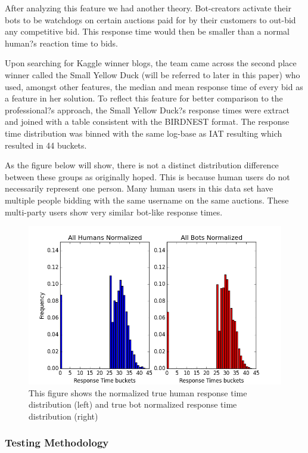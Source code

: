 \documentclass{article} %
\begin{document}
After analyzing this feature we had another theory. Bot-creators activate their bots to be watchdogs on certain auctions paid for by their customers to out-bid any competitive bid. This response time would then be smaller than a normal human?s reaction time to bids.

Upon searching for Kaggle winner blogs, the team came across the second place winner called the Small Yellow Duck (will be referred to later in this paper) who used, amongst other features, the median and mean response time of every bid as a feature in her solution. To reflect this feature for better comparison to the professional?s approach, the Small Yellow Duck?s response times were extract and joined with a table consistent with the BIRDNEST format. The response time distribution was binned with the same log-base as IAT resulting which resulted in 44 buckets.

As the figure below will show, there is not a distinct distribution difference between these groups as originally hoped. This is because human users do not necessarily represent one person. Many human users in this data set have multiple people bidding with the same username on the same auctions. These multi-party users show very similar bot-like response times.

\begin{figure}[h]
\centering
{\caption{This figure shows the normalized true human response time distribution (left) and true bot normalized response time distribution (right)} \includegraphics[scale=0.5]{img/bird_res_dist.png}}
\end{figure}

\subsubsection{Testing Methodology}
\end{document}
